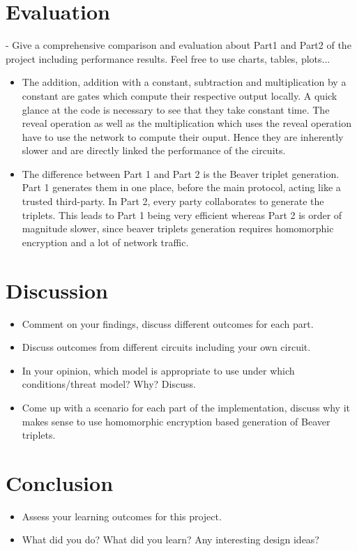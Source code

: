 \documentclass[10pt,conference]{IEEEtran}
\begin{document}
\section{Evaluation}
- Give a comprehensive comparison and evaluation about Part1 and Part2 of the project including performance results. Feel free to use charts, tables, plots...
\begin{itemize}
    \item The addition, addition with a constant, subtraction and multiplication by a constant are gates which compute their respective output locally. A quick glance at the code is necessary to see that they take constant time. The reveal operation as well as the multiplication which uses the reveal operation have to use the network to compute their ouput. Hence they are inherently slower and are directly linked the performance of the circuits.
    \item The difference between Part 1 and Part 2 is the Beaver triplet generation. Part 1 generates them in one place, before the main protocol, acting like a trusted third-party. In Part 2, every party collaborates to generate the triplets. This leads to Part 1 being very efficient whereas Part 2 is order of magnitude slower, since beaver triplets generation requires homomorphic encryption and a lot of network traffic. %
\end{itemize}

\section{Discussion}
\begin{itemize}
    \item Comment on your findings, discuss different outcomes for each part.
    \item Discuss outcomes from different circuits including your own circuit.
    \item In your opinion, which model is appropriate to use under which conditions/threat model? Why? Discuss.
    \item Come up with a scenario for each part of the implementation, discuss why it makes sense to use homomorphic encryption based generation of Beaver triplets.
\end{itemize}

\section{Conclusion}
\begin{itemize}
    \item Assess your learning outcomes for this project.
    \item What did you do? What did you learn? Any interesting design ideas? 
\end{itemize}



\end{document}
